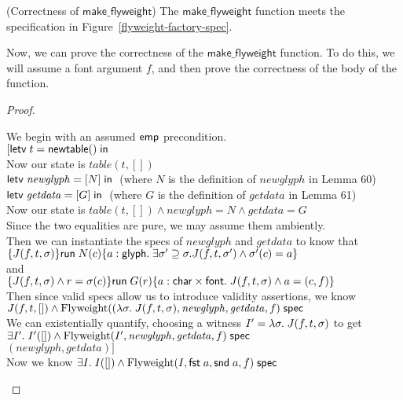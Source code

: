 \begin{lemma}{(Correctness of $\mathsf{make\_flyweight}$)}
  The $\mathsf{make\_flyweight}$ function meets the specification in Figure~\ref{flyweight-factory-spec}. 
\end{lemma}

Now, we can prove the correctness of the $\mathsf{make\_flyweight}$ function. To do
this, we will assume a font argument $f$, and then prove the correctness of the body
of the function.

\begin{proof}
\begin{tabbedproof}
\oo We begin with an assumed $\mathsf{emp}$ precondition. \\
\oo $[\mathsf{letv}\;t = \mathsf{newtable}()\;\mathsf{in}\;$ \\
\oo Now our state is $\mathit{table}(t, [])$ \\
\oo $\mathsf{letv}\;\mathit{newglyph} = [N]\;\mathsf{in}\;$ (where $N$ is the definition of $\mathit{newglyph}$ in Lemma 60) \\
\oo $\mathsf{letv}\;\mathit{getdata} = [G]\;\mathsf{in}\;$ (where $G$ is the  definition of $\mathit{getdata}$ in Lemma 61)\\
\oo Now our state is $\mathit{table}(t, []) \land \mathit{newglyph} = N \land \mathit{getdata} = G$ \\
\oo Since the two equalities are pure, we may assume them ambiently. \\
\oo Then we can instantiate the specs of $\mathit{newglyph}$ and $\mathit{getdata}$ to know that\\
\oo $\{{J(f, t, \sigma)}\}{\mathsf{run}\;N(c)}\{{a:\mathsf{glyph}}.\;{\exists \sigma' \supseteq \sigma. J(f, t, \sigma') \land \sigma'(c) = a}\}$\\
\oo and \\
\oo $\{{J(f, t, \sigma) \land r = \sigma(c)}\}{\mathsf{run}\;G(r)}\{{a:\mathsf{char} \times \mathsf{font}}.\;{J(f, t, \sigma) \land a = (c, f)}\}$\\
\oo Then since valid specs allow us to introduce validity assertions, we know  \\
\ox $J(f, t, []) \land {\mbox{Flyweight}((\lambda \sigma.\;J(f,t,\sigma), \mathit{newglyph}, \mathit{getdata}, f)}\;\mathsf{spec}$  \\
\oo We can existentially quantify, choosing a witness $I' = \lambda \sigma.\;J(f,t,\sigma)$ to get \\
\ox $\exists I'.\; I'([]) \land {\mbox{Flyweight}(I', \mathit{newglyph}, \mathit{getdata}, f)}\;\mathsf{spec}$  \\
\oo $(\mathit{newglyph}, \mathit{getdata})]$\\
\oo Now we know $\exists I.\;I([]) \land {\mbox{Flyweight}(I, \mathsf{fst}\; a, \mathsf{snd}\; a, f)}\;\mathsf{spec}$\\
\end{tabbedproof}
\end{proof}


